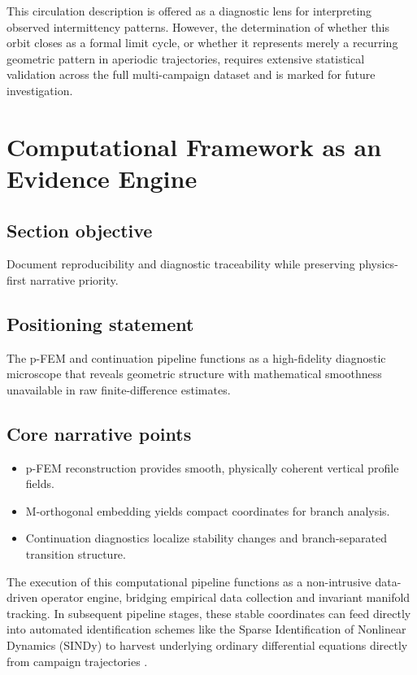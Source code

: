 \documentclass[12pt,a4paper]{article}
\begin{document}
This circulation description is offered as a diagnostic lens for interpreting observed intermittency patterns. However, the determination of whether this orbit closes as a formal limit cycle, or whether it represents merely a recurring geometric pattern in aperiodic trajectories, requires extensive statistical validation across the full multi-campaign dataset and is marked for future investigation.

\section{Computational Framework as an Evidence Engine}

\subsection{Section objective}

Document reproducibility and diagnostic traceability while preserving physics-first narrative priority.

\subsection{Positioning statement}

The p-FEM and continuation pipeline functions as a high-fidelity diagnostic microscope that reveals geometric structure with mathematical smoothness unavailable in raw finite-difference estimates.

\subsection{Core narrative points}

\begin{itemize}
  \item p-FEM reconstruction provides smooth, physically coherent vertical profile fields.
  \item M-orthogonal embedding yields compact coordinates for branch analysis.
  \item Continuation diagnostics localize stability changes and branch-separated transition structure.
\end{itemize}

The execution of this computational pipeline functions as a non-intrusive data-driven operator engine, bridging empirical data collection and invariant manifold tracking. In subsequent pipeline stages, these stable coordinates can feed directly into automated identification schemes like the Sparse Identification of Nonlinear Dynamics (SINDy) to harvest underlying ordinary differential equations directly from campaign trajectories \citep{brunton2016}.
\end{document}
